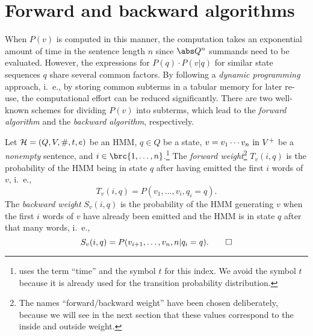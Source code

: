 \section{Forward and backward algorithms}

When $P(v)$ is computed in this manner, the computation takes an exponential
amount of time in the sentence length $n$ since $\abs Q^n$ summands need to be
evaluated. However, the expressions for $P(q)\cdot P(v|q)$ for similar state
sequences $q$ share several common factors. By following a \emph{dynamic
programming} approach, i.~e., by storing common subterms in a tabular memory
for later re-use, the computational effort can be reduced significantly. There
are two well-known schemes for dividing $P(v)$ into subterms, which lead to the
\emph{forward algorithm} and the \emph{backward algorithm}, respectively.

\begin{definition}
 Let $\mathcal H=(Q,V,\#,t,e)$ be an HMM, $q\in Q$ be a state, $v=v_1\cdots v_n\text{ in } V^+$
 be a \emph{nonempty} sentence, and $i\in\brc{1,\ldots,n}$.\footnote{\cite{jm09} uses
 the term ``time'' and the symbol $t$ for this index. We avoid the symbol $t$
 because it is already used for the transition probability distribution.} The \emph{forward
 weight}\footnote{The names ``forward/backward weight'' have been chosen
 deliberately, because we will see in the next section that these values
 correspond to the inside and outside weight.} $T_v(i,q)$ is the probability
 of the HMM being in state $q$ after having emitted the first $i$ words of
 $v$, i.~e.,
 \[
  T_v(i,q) = P(v_1,\ldots,v_i,q_i=q).
 \]
 The \emph{backward weight} $S_v(i,q)$ is the probability of the HMM
 generating $v$ when the first $i$ words of $v$ have already been emitted and
 the HMM is in state $q$ after that many words, i.~e.,
 \[
  S_v(i,q) = P(v_{i+1},\ldots,v_n,n|q_i=q). \qedhere
 \]
\end{definition}

